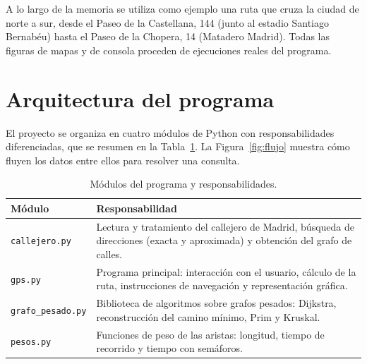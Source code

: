 \documentclass[11pt,a4paper]{article}
\newcommand{\code}[1]{\texttt{#1}}
\begin{document}
A lo largo de la memoria se utiliza como ejemplo una ruta que cruza la ciudad de norte a sur, desde el Paseo de la Castellana, 144 (junto al estadio Santiago Bernabéu) hasta el Paseo de la Chopera, 14 (Matadero Madrid). Todas las figuras de mapas y de consola proceden de ejecuciones reales del programa.

\section{Arquitectura del programa}

El proyecto se organiza en cuatro módulos de Python con responsabilidades diferenciadas, que se resumen en la Tabla~\ref{tab:modulos}. La Figura~\ref{fig:flujo} muestra cómo fluyen los datos entre ellos para resolver una consulta.

\begin{table}[H]
\centering
\caption{Módulos del programa y responsabilidades.}\label{tab:modulos}
\small
\begin{tabularx}{\linewidth}{@{}lX@{}}
\toprule
\textbf{Módulo} & \textbf{Responsabilidad}\\
\midrule
\code{callejero.py} & Lectura y tratamiento del callejero de Madrid, búsqueda de direcciones (exacta y aproximada) y obtención del grafo de calles.\\
\code{gps.py} & Programa principal: interacción con el usuario, cálculo de la ruta, instrucciones de navegación y representación gráfica.\\
\code{grafo\_pesado.py} & Biblioteca de algoritmos sobre grafos pesados: Dijkstra, reconstrucción del camino mínimo, Prim y Kruskal.\\
\code{pesos.py} & Funciones de peso de las aristas: longitud, tiempo de recorrido y tiempo con semáforos.\\
\bottomrule
\end{tabularx}
\end{table}
\end{document}
